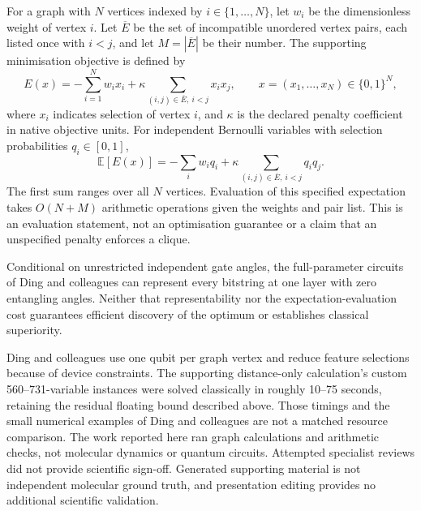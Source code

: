 \documentclass{article}
\begin{document}
For a graph with \(N\) vertices indexed by \(i\in\{1,\ldots,N\}\), let \(w_i\) be the dimensionless weight of vertex \(i\). Let \(\overline E\) be the set of incompatible unordered vertex pairs, each listed once with \(i<j\), and let \(M=|\overline E|\) be their number. The supporting minimisation objective is defined by
\[
 E(x)=-\sum_{i=1}^N w_i x_i
       +\kappa\sum_{(i,j)\in\overline E,\ i<j}x_ix_j,
 \qquad x=(x_1,\ldots,x_N)\in\{0,1\}^N,
\]
where \(x_i\) indicates selection of vertex \(i\), and \(\kappa\) is the declared penalty coefficient in native objective units. For independent Bernoulli variables with selection probabilities \(q_i\in[0,1]\),
\[
 \mathbb E[E(x)]=-\sum_iw_iq_i
       +\kappa\sum_{(i,j)\in\overline E,\ i<j}q_iq_j.
\]
The first sum ranges over all \(N\) vertices. Evaluation of this specified expectation takes \(O(N+M)\) arithmetic operations given the weights and pair list. This is an evaluation statement, not an optimisation guarantee or a claim that an unspecified penalty enforces a clique.

Conditional on unrestricted independent gate angles, the full-parameter circuits of Ding and colleagues can represent every bitstring at one layer with zero entangling angles. Neither that representability nor the expectation-evaluation cost guarantees efficient discovery of the optimum or establishes classical superiority.\cite{P}

Ding and colleagues use one qubit per graph vertex and reduce feature selections because of device constraints.\cite{P} The supporting distance-only calculation's custom 560--731-variable instances were solved classically in roughly 10--75 seconds, retaining the residual floating bound described above. Those timings and the small numerical examples of Ding and colleagues are not a matched resource comparison. The work reported here ran graph calculations and arithmetic checks, not molecular dynamics or quantum circuits. Attempted specialist reviews did not provide scientific sign-off. Generated supporting material is not independent molecular ground truth, and presentation editing provides no additional scientific validation.



\end{document}
